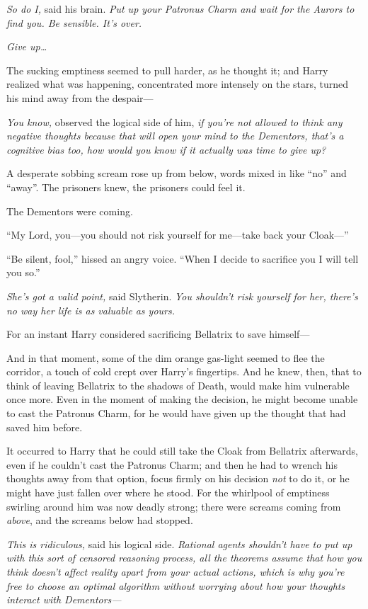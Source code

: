 \emph{So do I,} said his brain. \emph{Put up your Patronus Charm and wait for the Aurors to find you. Be sensible. It’s over.}

\emph{Give up…}

The sucking emptiness seemed to pull harder, as he thought it; and Harry realized what was happening, concentrated more intensely on the stars, turned his mind away from the despair—

\emph{You know,} observed the logical side of him, \emph{if you’re not allowed to think \emph{any} negative thoughts because that will open your mind to the Dementors, \emph{that’s} a cognitive bias too, how would you know if it actually \emph{was} time to give up?}

A desperate sobbing scream rose up from below, words mixed in like “no” and “away”. The prisoners knew, the prisoners could feel it.

The Dementors were coming.

“My Lord, you—you should not risk yourself for me—take back your Cloak—”

“Be silent, fool,” hissed an angry voice.
“When I decide to sacrifice you I will tell you so.”

\emph{She’s got a valid point,} said Slytherin. \emph{You \emph{shouldn’t} risk yourself for her, there’s no way her life is as valuable as yours.}

For an instant Harry considered sacrificing Bellatrix to save himself—

And in that moment, some of the dim orange gas-light seemed to flee the corridor, a touch of cold crept over Harry’s fingertips. And he knew, then, that to think of leaving Bellatrix to the shadows of Death, would make him vulnerable once more. Even in the moment of making the decision, he might become unable to cast the Patronus Charm, for he would have given up the thought that had saved him before.

It occurred to Harry that he could still take the Cloak from Bellatrix afterwards, even if he couldn’t cast the Patronus Charm; and then he had to wrench his thoughts away from that option, focus firmly on his decision \emph{not} to do it, or he might have just fallen over where he stood. For the whirlpool of emptiness swirling around him was now deadly strong; there were screams coming from \emph{above}, and the screams below had stopped.

\emph{This is ridiculous,} said his logical side. \emph{Rational agents shouldn’t have to put up with this sort of censored reasoning process, all the theorems assume that how you think doesn’t affect reality apart from your actual actions, which is why you’re free to choose an optimal algorithm without worrying about how your thoughts interact with Dementors—}


